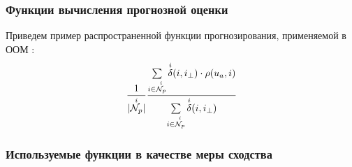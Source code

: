
\subsubsection{Функции вычисления прогнозной оценки}
Приведем
пример распространенной функции прогнозирования, применяемой в ООМ
 \cite{item-based}:
\begin{equation}\label{fpredict-ors}
	\frac{1}{|{\overset{i}{\mathcal{N}_p}}|} \frac{\sum \limits_{i \in {\overset{i}{\mathcal{N}_p}}} {\overset{i}{\mathcal{\delta}}}(i,i_{\bot}) \cdot \rho(u_a,i)}{
\sum \limits_{i \in {\overset{i}{\mathcal{N}_p}}} {\overset{i}{\mathcal{\delta}}}(i,i_{\bot})
}
\end{equation}
\subsubsection{Используемые функции в качестве меры сходства}
